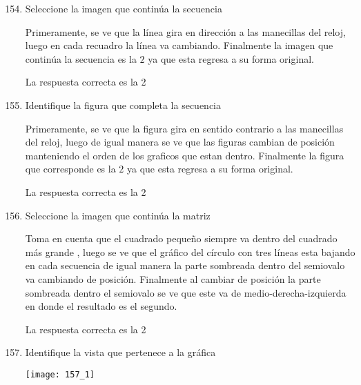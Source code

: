 \documentclass[11pt, a4paper]{article} %
\theoremstyle{dotlessP}
\theoremstyle{dotlessS}
\begin{document}
\begin{enumerate}[label=\color{dg}\theenumi.]
        \setcounter{enumi}{153}
        \item {\color{db} Seleccione la imagen que continúa la secuencia}
        
        Primeramente, se ve que la línea gira en dirección a las manecillas del reloj, luego en cada recuadro  la línea va cambiando. Finalmente la imagen que continúa la secuencia es la \(2\) ya que esta regresa a su forma original.
        
        
        
        
         {\color{dh}La respuesta correcta es la 2}
 
 \item{\color{db}Identifique la figura que completa la secuencia} 
 
 Primeramente, se ve que la figura gira en sentido contrario a las manecillas del reloj, luego de igual manera se ve que las figuras cambian de posición manteniendo el orden de los graficos que estan dentro. Finalmente la figura que corresponde es la \(2\) ya que esta regresa a su forma original.
 
 
 
 
 
 {\color{dh}La respuesta correcta es la 2}
 
 \item{\color{db}Seleccione la imagen que continúa la matriz}
 
 Toma en cuenta que el cuadrado pequeño siempre va dentro del cuadrado más grande , luego se ve que el gráfico del círculo con tres líneas esta bajando en cada secuencia de igual manera la parte sombreada dentro del semiovalo va cambiando de posición. Finalmente al cambiar de posición la parte sombreada dentro el semiovalo se ve que este va de medio-derecha-izquierda en donde el resultado es el segundo.
 
 {\color{dh}La respuesta correcta es la 2}

\item{\color{db}Identifique la vista que pertenece a la gráfica}

\begin{center}
\texttt{[image: 157\_1]}
\end{center}


\end{enumerate}
\end{document}
